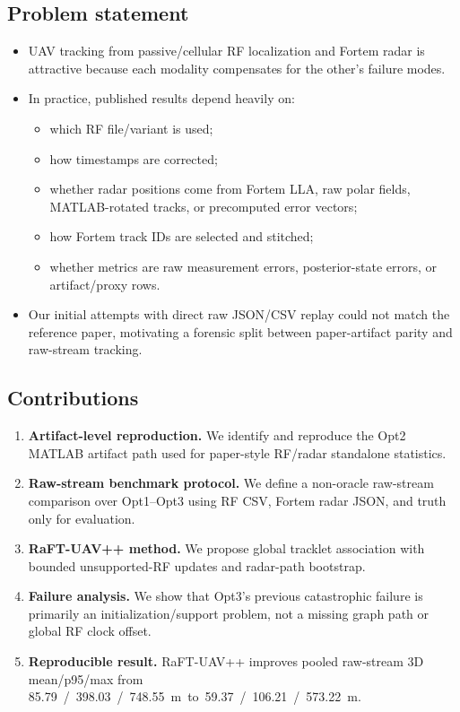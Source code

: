 \documentclass[10pt,conference]{IEEEtran}
\newcommand{\raftpp}{RaFT-UAV++\xspace}
\begin{document}
\subsection{Problem statement}
\begin{itemize}[leftmargin=*]
  \item UAV tracking from passive/cellular RF localization and Fortem radar is attractive because each modality compensates for the other's failure modes.
  \item In practice, published results depend heavily on:\vspace{-0.25em}
  \begin{itemize}[leftmargin=*]
    \item which RF file/variant is used;
    \item how timestamps are corrected;
    \item whether radar positions come from Fortem LLA, raw polar fields, MATLAB-rotated tracks, or precomputed error vectors;
    \item how Fortem track IDs are selected and stitched;
    \item whether metrics are raw measurement errors, posterior-state errors, or artifact/proxy rows.
  \end{itemize}
  \item Our initial attempts with direct raw JSON/CSV replay could not match the reference paper, motivating a forensic split between paper-artifact parity and raw-stream tracking.
\end{itemize}

\subsection{Contributions}
\begin{enumerate}[leftmargin=*]
  \item \textbf{Artifact-level reproduction.} We identify and reproduce the Opt2 MATLAB artifact path used for paper-style RF/radar standalone statistics.
  \item \textbf{Raw-stream benchmark protocol.} We define a non-oracle raw-stream comparison over Opt1--Opt3 using RF CSV, Fortem radar JSON, and truth only for evaluation.
  \item \textbf{\raftpp method.} We propose global tracklet association with bounded unsupported-RF updates and radar-path bootstrap.
  \item \textbf{Failure analysis.} We show that Opt3's previous catastrophic failure is primarily an initialization/support problem, not a missing graph path or global RF clock offset.
  \item \textbf{Reproducible result.} \raftpp improves pooled raw-stream 3D mean/p95/max from \SI{85.79}/\SI{398.03}/\SI{748.55}{m} to \SI{59.37}/\SI{106.21}/\SI{573.22}{m}.
\end{enumerate}
\end{document}
